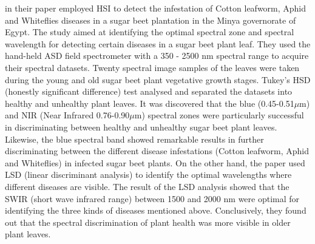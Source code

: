 

\item \cite{yones2019ajab} in their paper employed HSI to detect the infestation of Cotton leafworm, Aphid and Whiteflies diseases in a sugar beet plantation in the Minya governorate of Egypt. The study aimed at identifying the optimal spectral zone and spectral wavelength for detecting certain diseases in a sugar beet plant leaf. They used the hand-held ASD field spectrometer with a 350 - 2500 nm spectral range to acquire their spectral datasets. Twenty spectral image samples of the leaves were taken during the young and old sugar beet plant vegetative growth stages. Tukey’s HSD (honestly significant difference) test analysed and separated the datasets into healthy and unhealthy plant leaves. It was discovered that the blue (0.45-0.51$\mu$m) and NIR (Near Infrared 0.76-0.90$\mu$m) spectral zones were particularly successful in discriminating between healthy and unhealthy sugar beet plant leaves. Likewise, the blue spectral band showed remarkable results in further discriminating between the different disease infestations (Cotton leafworm, Aphid and Whiteflies) in infected sugar beet plants.
On the other hand, the paper used LSD (linear discriminant analysis) to identify the optimal wavelengths where different diseases are visible. The result of the LSD analysis showed that the SWIR (short wave infrared range) between 1500 and 2000 nm were optimal for identifying the three kinds of diseases mentioned above. Conclusively, they found out that the spectral discrimination of plant health was more visible in older plant leaves. 

